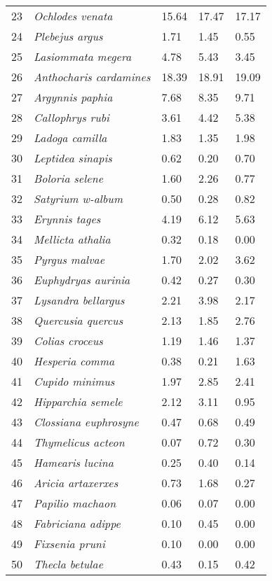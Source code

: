 \begin{table}[h]
\begin{tabular}{rllll}
23 & \textit{Ochlodes venata} & 15.64 & 17.47 & 17.17 \\
24 & \textit{Plebejus argus} & 1.71 & 1.45 & 0.55 \\
25 & \textit{Lasiommata megera} & 4.78 & 5.43 & 3.45 \\
26 & \textit{Anthocharis cardamines} & 18.39 & 18.91 & 19.09 \\
27 & \textit{Argynnis paphia} & 7.68 & 8.35 & 9.71 \\
28 & \textit{Callophrys rubi} & 3.61 & 4.42 & 5.38 \\
29 & \textit{Ladoga camilla} & 1.83 & 1.35 & 1.98 \\
30 & \textit{Leptidea sinapis} & 0.62 & 0.20 & 0.70 \\
31 & \textit{Boloria selene} & 1.60 & 2.26 & 0.77 \\
32 & \textit{Satyrium w-album} & 0.50 & 0.28 & 0.82 \\
33 & \textit{Erynnis tages} & 4.19 & 6.12 & 5.63 \\
34 & \textit{Mellicta athalia} & 0.32 & 0.18 & 0.00 \\
35 & \textit{Pyrgus malvae} & 1.70 & 2.02 & 3.62 \\
36 & \textit{Euphydryas aurinia} & 0.42 & 0.27 & 0.30 \\
37 & \textit{Lysandra bellargus} & 2.21 & 3.98 & 2.17 \\
38 & \textit{Quercusia quercus} & 2.13 & 1.85 & 2.76 \\
39 & \textit{Colias croceus} & 1.19 & 1.46 & 1.37 \\
40 & \textit{Hesperia comma} & 0.38 & 0.21 & 1.63 \\
41 & \textit{Cupido minimus} & 1.97 & 2.85 & 2.41 \\
42 & \textit{Hipparchia semele} & 2.12 & 3.11 & 0.95 \\
43 & \textit{Clossiana euphrosyne} & 0.47 & 0.68 & 0.49 \\
44 & \textit{Thymelicus acteon} & 0.07 & 0.72 & 0.30 \\
45 & \textit{Hamearis lucina} & 0.25 & 0.40 & 0.14 \\
46 & \textit{Aricia artaxerxes} & 0.73 & 1.68 & 0.27 \\
47 & \textit{Papilio machaon} & 0.06 & 0.07 & 0.00 \\
48 & \textit{Fabriciana adippe} & 0.10 & 0.45 & 0.00 \\
49 & \textit{Fixsenia pruni} & 0.10 & 0.00 & 0.00 \\
50 & \textit{Thecla betulae} & 0.43 & 0.15 & 0.42 \\

\end{tabular}
\end{table}
